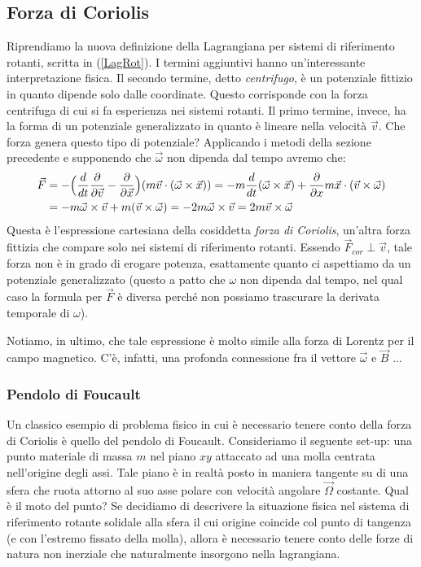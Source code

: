 \documentclass[a4paper,openany]{article}
\begin{document}
	\subsection{Forza di Coriolis}
	Riprendiamo la nuova definizione della Lagrangiana per sistemi di riferimento rotanti, scritta in (\ref{LagRot}). I termini aggiuntivi hanno un'interessante interpretazione fisica. Il secondo termine, detto \textit{centrifugo}, è un potenziale fittizio in quanto dipende solo dalle coordinate. Questo corrisponde con la forza centrifuga di cui si fa esperienza nei sistemi rotanti. Il primo termine, invece, ha la forma di un potenziale generalizzato in quanto è lineare nella velocità $\vec{v}$. Che forza genera questo tipo di potenziale? Applicando i metodi della sezione precedente e supponendo che $\vec{\omega}$ non dipenda dal tempo avremo che:
	\begin{equation}
		\begin{aligned}
			\vec{F} &= - \Bigl(\dfrac{d}{dt}\dfrac{\partial}{\partial \vec{v}} - \dfrac{\partial}{\partial \vec{x}}\Bigl) (m\vec{v}\cdot(\vec{\omega}\times\vec{x})) = - m\dfrac{d}{dt}(\vec{\omega}\times\vec{x}) +
			\dfrac{\partial }{\partial x} m\vec{x}\cdot(\vec{v}\times\vec{\omega})
			\\
			\vspace{2cm}
			&= - m\vec{\omega}\times\vec{v} + m(\vec{v}\times\vec{\omega}) = - 2m\vec{\omega}\times\vec{v} = 2m\vec{v}\times\vec{\omega} \\
		\end{aligned}
		\label{ForzaCoriolis}
	\end{equation}
	Questa è l'espressione cartesiana della cosiddetta \textit{forza di Coriolis}, un'altra forza fittizia che compare solo nei sistemi di riferimento rotanti.
	Essendo $\vec{F}_{cor} \perp \vec{v}$, tale forza non è in grado di erogare potenza, esattamente quanto ci aspettiamo da un potenziale generalizzato (questo a patto che $\omega$ non dipenda dal tempo, nel qual caso la formula per $\vec{F}$ è diversa perché non possiamo trascurare la derivata temporale di $\omega$).
	
	 Notiamo, in ultimo, che tale espressione è molto simile alla forza di Lorentz per il campo magnetico. C'è, infatti, una profonda connessione fra il vettore $\vec{\omega}$ e $\vec{B}$ ...
	\subsubsection{Pendolo di Foucault}
	Un classico esempio di problema fisico in cui è necessario tenere conto della forza di Coriolis è quello del pendolo di Foucault. Consideriamo il seguente set-up: una punto materiale di massa $m$ nel piano $xy$ attaccato ad una molla centrata nell'origine degli assi. Tale piano è in realtà posto in maniera tangente su di una sfera che ruota attorno al suo asse polare con velocità angolare $\vec{\Omega}$ costante. Qual è il moto del punto? Se decidiamo di descrivere la situazione fisica nel sistema di riferimento rotante solidale alla sfera il cui origine coincide col punto di tangenza (e con l'estremo fissato della molla), allora è necessario tenere conto delle forze di natura non inerziale che naturalmente insorgono nella lagrangiana. 
	
\end{document}
